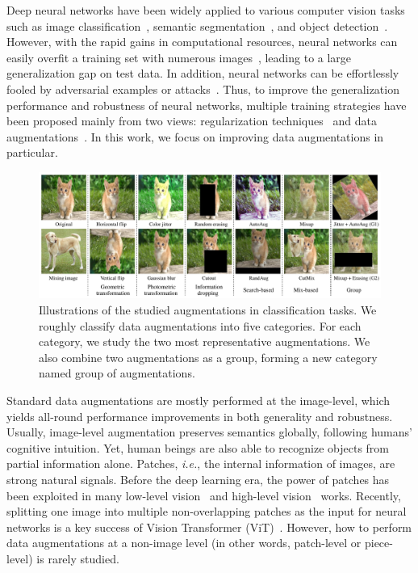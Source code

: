 \documentclass{article}
\newcommand\ie{\emph{i.e.}} \newcommand\Ie{\emph{I.e.}}
\begin{document}
Deep neural networks have been widely applied to various computer vision tasks such as image classification~\cite{resnet,alexnet,vgg}, semantic segmentation~\cite{FCN,deeplab}, and object detection~\cite{he2017mask,RCNN}. However, with the rapid gains in computational resources, neural networks can easily overfit a training set with numerous images~\cite{imagenet}, leading to a large generalization gap on test data. In addition, neural networks can be effortlessly fooled by adversarial examples or attacks~\cite{hendrycks2021natural, pgd}. Thus, to improve the generalization performance and robustness of neural networks, multiple training strategies have been proposed mainly from two views: regularization techniques~\cite{srivastava2014dropout, huang2016deep,szegedy2016rethinking} and data augmentations~\cite{alexnet}. In this work, we focus on improving data augmentations in particular.

\begin{figure}[!htb]
     \centering
     \includegraphics[width = 17cm]
     {figures/aug_overview.pdf}
     \caption{Illustrations of the studied augmentations in classification tasks. We roughly classify data augmentations into five categories. For each category, we study the two most representative augmentations. We also combine two augmentations as a group, forming a new category named group of augmentations. }
     \label{fig:aug_overview}
\end{figure}

Standard data augmentations are mostly performed at the image-level, which yields all-round performance improvements in both generality and robustness. Usually, image-level augmentation preserves semantics globally, following humans' cognitive intuition. Yet, human beings are also able to recognize objects from partial information alone. Patches, \ie{}, the internal information of images, are strong natural signals. Before the deep learning era, the power of patches has been exploited in many low-level vision~\cite{efros1999texture,kervrann2006optimal} and high-level vision~\cite{sivic2003video,csurka2004visual,lazebnik2006beyond} works. Recently, splitting one image into multiple non-overlapping patches as the input for neural networks is a key success of Vision Transformer (ViT)~\cite{dosovitskiy2020image}. 
However, how to perform data augmentations at a non-image level (in other words, patch-level or piece-level) is rarely studied.
\end{document}
